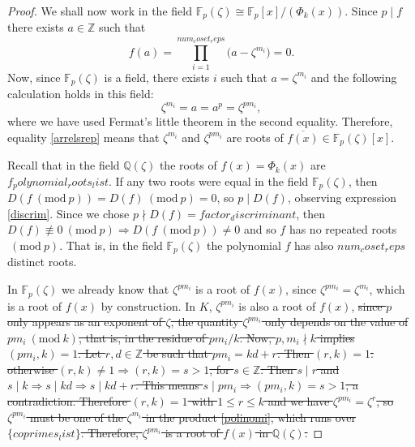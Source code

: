 \documentclass[a4paper, 12pt]{article}
\theoremstyle{definition}
\theoremstyle{remark}
\newcommand{\Z}{\ensuremath{\mathbb{Z}}}
\newcommand{\Q}{\ensuremath{\mathbb{Q}}}
\newcommand{\F}{\ensuremath{\mathbb{F}}}
\newcommand{\Mod}[1]{\ (\mathrm{mod}\ #1)} %
\begin{document}
\begin{proof}
We shall now work in the field $\F_p(\zeta)\cong\F_p[x]/(\Phi_{{k}}(x))$. Since $p\mid f$ there exists $a\in\Z$ such that 
\begin{equation*}
f(a)=\prod_{i=1}^{{num_coset_reps}}\big(a-\zeta^{m_i}\big)=0.
\end{equation*}
Now, since $\F_p(\zeta)$ is a field, there exists $i$ such that $a=\zeta^{m_i}$ and the following calculation holds in this field:
\begin{equation}\label{arrelsrep}
\zeta^{m_i}=a=a^p=\zeta^{pm_i},
\end{equation}
where we have used Fermat's little theorem in the second equality. Therefore, equality \eqref{arrelsrep} means that $\zeta^{m_i}$ and $\zeta^{pm_i}$ are roots of $\overline{f(x)}\in\F_p(\zeta)[x]$. 

Recall that in the field $\Q(\zeta)$ the roots of $f(x)=\Phi_{{k}}(x)$ are ${f_polynomial_roots_list}$. If any two roots were equal in the field $\F_p(\zeta)$, then $D(f \Mod{p})=D(f) \Mod{p}=0$, so $p\mid D(f)$, observing expression \eqref{discrim}. Since we chose $p\nmid D(f)={factor_discriminant}$, then $D(f)\not\equiv 0 \Mod{p} \Rightarrow D(f \Mod{p})\neq 0$ and so $f$ has no repeated roots$\Mod{{p}}$. That is, in the field $\F_p(\zeta)$ the polynomial $f$ has also ${num_coset_reps}$ distinct roots.

In $\F_p(\zeta)$ we already know that $\zeta^{pm_i}$ is a root of $f(x)$, since $\zeta^{pm_i}=\zeta^{m_i}$, which is a root of $f(x)$ by construction. In $K$, $\zeta^{pm_i}$ is also a root of $f(x)$, \sout{since $p$ only appears as an exponent of $\zeta$, the quantity $\zeta^{pm_i}$ only depends on the value of $pm_i \Mod{{k}}$, that is, in the residue of $pm_i/{k}$. Now, $p,m_i\nmid {k}$ implies $(pm_i,{k})=1$. Let $r,d\in\Z$ be such that $pm_i={k}d+r$. Then $(r,{k})=1$: otherwise $(r,{k})\neq 1\Rightarrow (r,{k})=s>1$, for $s\in\Z$. Then $s\mid r$ and $s\mid {k}\Rightarrow s\mid {k}d \Rightarrow s\mid {k}d+r$. This means $s\mid pm_i\Rightarrow (pm_i,{k})=s>1$, a contradiction. Therefore $(r,{k})=1$ with $1\leqslant r \leqslant{k}$ and we have $\zeta^{pm_i}=\zeta^{r}$, so $\zeta^{pm_i}$ must be one of the $\zeta^{m_i}$ in the product \eqref{polinomi}, which runs over $\{{coprimes_list}\}$. Therefore, $\zeta^{pm_i}$ is a root of $f(x)$ in $\Q(\zeta)$.}


\end{proof}
\end{document}
